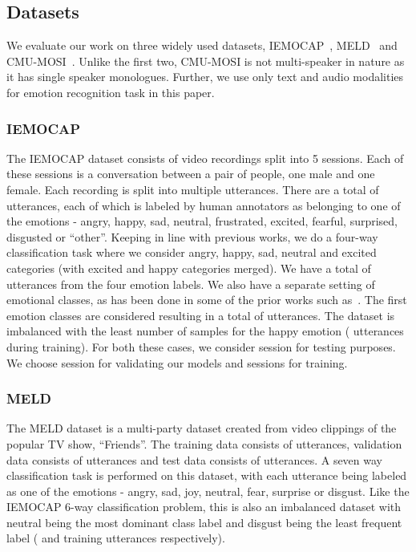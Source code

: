 \documentclass[lettersize,journal]{IEEEtran}
\begin{document}
\subsection{Datasets}
We evaluate our work on three widely used datasets, IEMOCAP~\cite{busso2008iemocap}, MELD~\cite{poria2019meld} and CMU-MOSI~\cite{zadeh2016mosi}. Unlike the first two, CMU-MOSI is not multi-speaker  in nature as it has single speaker monologues. Further, we use only text and audio modalities for emotion recognition task in this paper.
\subsubsection{IEMOCAP}
The IEMOCAP dataset consists of  video recordings split into 5 sessions. Each of these sessions is a conversation between a pair of people, one male and one female. Each recording is split into multiple utterances. There are a total of   utterances, each of which is labeled by human annotators as belonging to one of the  emotions -  angry, happy, sad, neutral, frustrated, excited, fearful, surprised, disgusted or ``other''. Keeping in line with previous works, we do a four-way classification task where we consider angry, happy, sad, neutral and excited categories (with excited and happy categories merged). We have a total of  utterances from the four emotion labels. We also have a separate setting of  emotional classes,  as has been done in some of the prior works such as~\cite{majumder2019dialoguernn}. The first  emotion classes are considered resulting in a total of  utterances. The dataset is imbalanced with the least number of samples for the happy emotion ( utterances during training). For both these cases, we consider session  for testing purposes. We choose session  for validating our models and sessions  for training.

\subsubsection{MELD}
The MELD dataset is a multi-party dataset created from video clippings of the popular TV show, ``Friends''. The training data consists of  utterances, validation data consists of  utterances and  test data consists of  utterances.
A seven way classification task is performed on this dataset, with each utterance being labeled as one of the  emotions - angry, sad, joy, neutral, fear, surprise or disgust. Like the IEMOCAP 6-way classification problem, this is also an imbalanced dataset with neutral being the most dominant class label and disgust being the least frequent label ( and  training utterances respectively).
\end{document}
